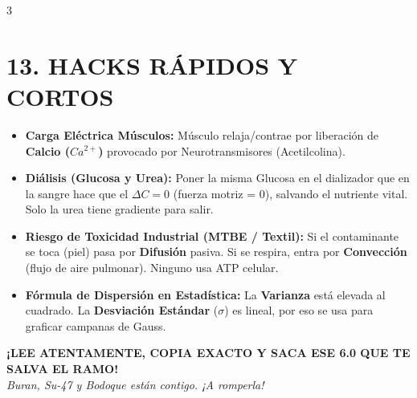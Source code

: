\documentclass[11pt,landscape,letterpaper]{extarticle}
\begin{document}
\begin{multicols*}{3}
	\section{13. HACKS RÁPIDOS Y CORTOS}
	\begin{itemize}
		\item \textbf{Carga Eléctrica Músculos:} Músculo relaja/contrae por liberación de \textbf{Calcio ($Ca^{2+}$)} provocado por Neurotransmisores (Acetilcolina).
		\item \textbf{Diálisis (Glucosa y Urea):} Poner la misma Glucosa en el dializador que en la sangre hace que el $\Delta C = 0$ (fuerza motriz = 0), salvando el nutriente vital. Solo la urea tiene gradiente para salir.
		\item \textbf{Riesgo de Toxicidad Industrial (MTBE / Textil):} Si el contaminante se toca (piel) pasa por \textbf{Difusión} pasiva. Si se respira, entra por \textbf{Convección} (flujo de aire pulmonar). Ninguno usa ATP celular.
		\item \textbf{Fórmula de Dispersión en Estadística:} La \textbf{Varianza} está elevada al cuadrado. La \textbf{Desviación Estándar} ($\sigma$) es lineal, por eso se usa para graficar campanas de Gauss.
	\end{itemize}

	\vspace{0.5cm}
	\begin{center}
		\textbf{\color{myblue}\LARGE ¡LEE ATENTAMENTE, COPIA EXACTO Y SACA ESE 6.0 QUE TE SALVA EL RAMO!} \\
		\textit{Buran, Su-47 y Bodoque están contigo. ¡A romperla!}
	\end{center}

\end{multicols*}
\end{document}
